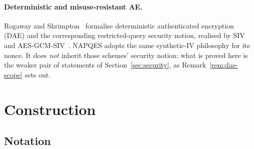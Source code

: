 \documentclass[11pt,a4paper]{article}
\begin{document}
\paragraph{Deterministic and misuse-resistant AE.}
Rogaway and Shrimpton~\cite{rogaway2006} formalise deterministic
authenticated encryption (DAE) and the corresponding restricted-query
security notion, realised by SIV~\cite{rfc5297} and
AES-GCM-SIV~\cite{rfc8452}. NAPQES adopts the same synthetic-IV philosophy
for its nonce. It does \emph{not} inherit those schemes' security notion:
what is proved here is the weaker pair of statements of
Section~\ref{sec:security}, as Remark~\ref{rem:dae-scope} sets out.

\section{Construction}
\label{sec:construction}

\subsection{Notation}
\label{sec:notation}
\end{document}
